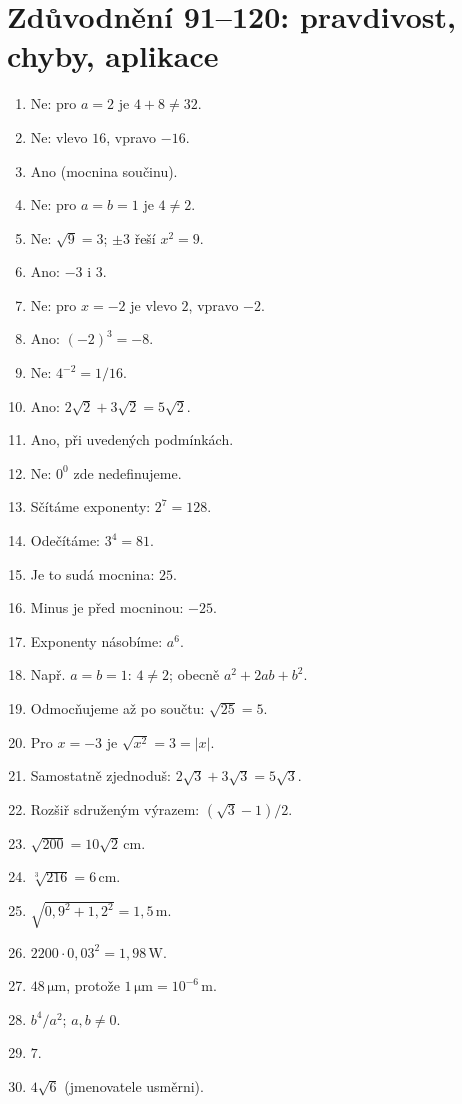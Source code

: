 \documentclass[11pt,a4paper]{article}
\begin{document}
\section*{Zdůvodnění 91--120: pravdivost, chyby, aplikace}
\begin{enumerate}[label=\textbf{\arabic*.},leftmargin=9mm,itemsep=4pt,start=91]
\small
\item Ne: pro $a=2$ je $4+8\ne32$.
\item Ne: vlevo $16$, vpravo $-16$.
\item Ano (mocnina součinu).
\item Ne: pro $a=b=1$ je $4\ne2$.
\item Ne: $\sqrt9=3$; $\pm3$ řeší $x^2=9$.
\item Ano: $-3$ i $3$.
\item Ne: pro $x=-2$ je vlevo $2$, vpravo $-2$.
\item Ano: $(-2)^3=-8$.
\item Ne: $4^{-2}=1/16$.
\item Ano: $2\sqrt2+3\sqrt2=5\sqrt2$.
\item Ano, při uvedených podmínkách.
\item Ne: $0^0$ zde nedefinujeme.
\item Sčítáme exponenty: $2^7=128$.
\item Odečítáme: $3^4=81$.
\item Je to sudá mocnina: $25$.
\item Minus je před mocninou: $-25$.
\item Exponenty násobíme: $a^6$.
\item Např. $a=b=1$: $4\ne2$; obecně $a^2+2ab+b^2$.
\item Odmocňujeme až po součtu: $\sqrt{25}=5$.
\item Pro $x=-3$ je $\sqrt{x^2}=3=|x|$.
\item Samostatně zjednoduš: $2\sqrt3+3\sqrt3=5\sqrt3$.
\item Rozšiř sdruženým výrazem: $(\sqrt3-1)/2$.
\item $\sqrt{200}=10\sqrt2\,\mathrm{cm}$.
\item $\sqrt[3]{216}=6\,\mathrm{cm}$.
\item $\sqrt{0{,}9^2+1{,}2^2}=1{,}5\,\mathrm m$.
\item $2200\cdot0{,}03^2=1{,}98\,\mathrm W$.
\item $48\,\mathrm{\mu m}$, protože $1\,\mathrm{\mu m}=10^{-6}\,\mathrm m$.
\item $b^4/a^2$; $a,b\ne0$.
\item $7$.
\item $4\sqrt6$ (jmenovatele usměrni).
\end{enumerate}
\end{document}
